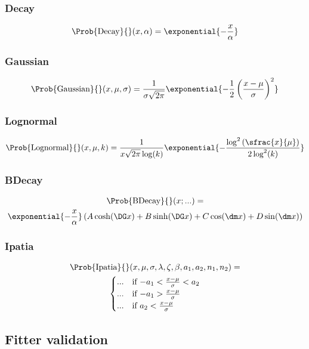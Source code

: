 \subsubsection{Decay}
\begin{equation}
  \Prob{\text{Decay}}{}(x, \alpha) = \exponential{- \frac{x}{\alpha}}
\end{equation}

\subsubsection{Gaussian}
\begin{equation}
  \Prob{\text{Gaussian}}{}(x, \mu, \sigma) = \frac{1}{\sigma\sqrt{2\pi}}\exponential{-\frac{1}{2} \left(\frac{x-\mu}{\sigma}\right)^2}
\end{equation}

\subsubsection{Lognormal}
\begin{equation}
  \Prob{\text{Lognormal}}{}(x, \mu, k) = \frac{1}{x \sqrt{2\pi} \log (k)} \exponential{-\frac{\log^2 \left(\sfrac{x}{\mu}\right)}{2 \log^2(k)}}
\end{equation}

\subsubsection{BDecay}
\begin{multline}
  \Prob{\text{BDecay}}{}(x;...) = \\ \exponential{- \frac{x}{\alpha}}\left( A \cosh (\DG x) + B \sinh (\DG x) + C \cos (\dm x) + D \sin (\dm x) \right)
\end{multline}

\subsubsection{Ipatia}
\begin{multline}
  \Prob{\text{Ipatia}}{}(x, \mu, \sigma, \lambda, \zeta, \beta, a_1, a_2, n_1, n_2) = \\
    \begin{cases}
    ...     & \text{if $-a_1 < \frac{x-\mu}{\sigma} < a_2$} \\
    ...     & \text{if $-a_1 > \frac{x-\mu}{\sigma}      $} \\
    ...     & \text{if $ a_2 < \frac{x-\mu}{\sigma}$} \\
  \end{cases}
\end{multline}

\newpage




\subsection{Fitter validation}
\label{sec:measurement_of_sin2beta:likelihood_fit:validation}
